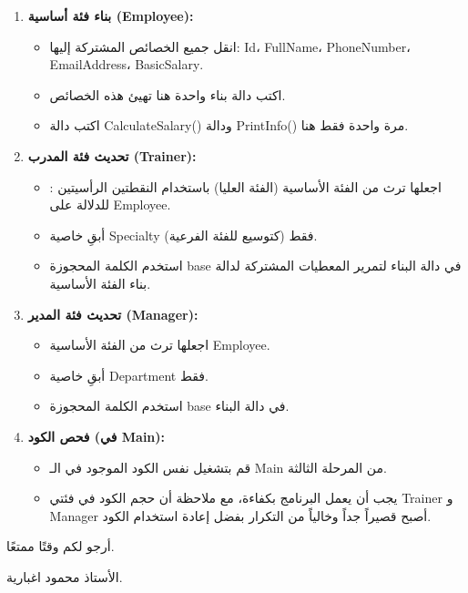 \documentclass[14pt]{extarticle}
\begin{document}
\begin{enumerate}[itemsep=3em]
    \item
    \textbf{بناء فئة أساسية (\textenglish{Employee}):}
    \begin{itemize}
        \item انقل جميع الخصائص المشتركة إليها: \textenglish{Id}، \textenglish{FullName}، \textenglish{PhoneNumber}، \textenglish{EmailAddress}، \textenglish{BasicSalary}.
        \item اكتب دالة بناء واحدة هنا تهيئ هذه الخصائص.
        \item اكتب دالة \textenglish{CalculateSalary()} ودالة \textenglish{PrintInfo()} مرة واحدة فقط هنا.
    \end{itemize}

    \item
    \textbf{تحديث فئة المدرب (\textenglish{Trainer}):}
    \begin{itemize}
        \item اجعلها ترث من الفئة الأساسية (الفئة العليا) باستخدام النقطتين الرأسيتين \textenglish{:} للدلالة على \textenglish{Employee}.
        \item أبقِ خاصية \textenglish{Specialty} فقط (كتوسيع للفئة الفرعية).
        \item استخدم الكلمة المحجوزة \textenglish{base} في دالة البناء لتمرير المعطيات المشتركة لدالة بناء الفئة الأساسية.
    \end{itemize}

    \item
    \textbf{تحديث فئة المدير (\textenglish{Manager}):}
    \begin{itemize}
        \item اجعلها ترث من الفئة الأساسية \textenglish{Employee}.
        \item أبقِ خاصية \textenglish{Department} فقط.
        \item استخدم الكلمة المحجوزة \textenglish{base} في دالة البناء.
    \end{itemize}

    \item
    \textbf{فحص الكود (في \textenglish{Main}):}
    \begin{itemize}
        \item قم بتشغيل نفس الكود الموجود في الـ \textenglish{Main} من المرحلة الثالثة.
        \item يجب أن يعمل البرنامج بكفاءة، مع ملاحظة أن حجم الكود في فئتي \textenglish{Trainer} و \textenglish{Manager} أصبح قصيراً جداً وخالياً من التكرار بفضل إعادة استخدام الكود.
    \end{itemize}
\end{enumerate}

\vspace{1cm}
\begin{flushleft}
أرجو لكم وقتًا ممتعًا.

الأستاذ محمود اغبارية.
\end{flushleft}
\end{document}
